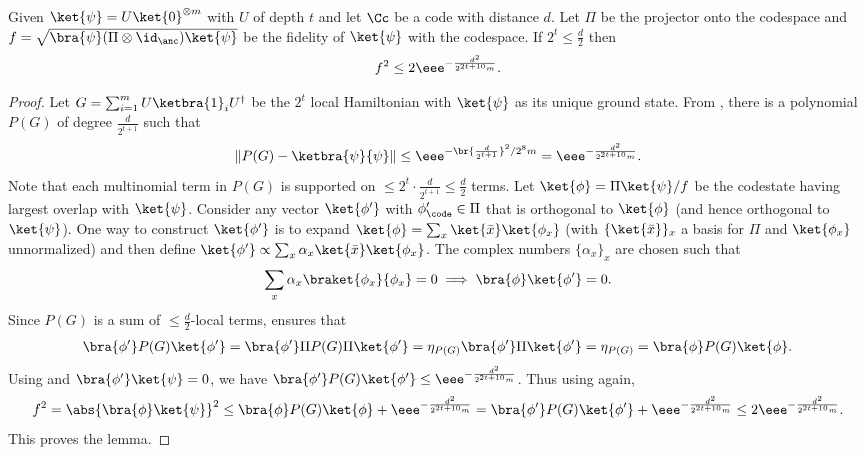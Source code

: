 \documentclass{toc}
\begin{document}
\begin{lemma}
\label{lem:distfidbound}
Given $\ket{\psi}=U\ket{0}^{\otimes m}$ with $U$ of depth $t$ and let $\Cc$ be a code with distance $d$. Let $\Pi$ be the projector onto the codespace and  $f=\sqrt{\bra{\psi}(\Pi\otimes \id_{\anc})\ket{\psi}}$ be the fidelity of $\ket{\psi}$ with the codespace. If $2^t\leq \frac{d}{2}$ then
\begin{align}f^2\leq 2\eee^{-\frac{d^2}{2^{2t+10}m}}.\end{align}
\end{lemma}
\begin{proof}
Let $G= \sum_{i=1}^m U\ketbra{1}_i U^{\dagger}$ be the $2^t$ local Hamiltonian with $\ket{\psi}$ as its unique ground state. From , there is a polynomial $P(G)$ of degree $\frac{d}{2^{t+1}}$ such that
\begin{equation}
\label{eq:KLSpoly}
\|P(G)-\ketbra{\psi}{\psi}\|\leq \eee^{-\br{\frac{d}{2^{t+1}}}^2/2^8m} = \eee^{-\frac{d^2}{2^{2t+10}m}}.    
\end{equation}
Note that each multinomial term in $P(G)$ is supported on $\leq 2^t\cdot \frac{d}{2^{t+1}} \leq \frac{d}{2}$ terms. Let $\ket{\phi}= \Pi\ket{\psi}/f$ be the codestate having largest overlap with $\ket{\psi}$. Consider any vector $\ket{\phi'}$ with $\phi'_{\code}\in \Pi$ that is orthogonal to $\ket{\phi}$ (and hence orthogonal to $\ket{\psi}$). One way to construct $\ket{\phi'}$ is to expand $\ket{\phi}=\sum_x \ket{\bar{x}}\ket{\phi_x}$ (with $\{\ket{\bar{x}}\}_x$ a basis for $\Pi$ and $\ket{\phi_x}$ unnormalized) and then define $\ket{\phi'}\propto\sum_x \alpha_x\ket{\bar{x}}\ket{\phi_x}$. The complex numbers $\{\alpha_x\}_x$ are chosen such that 
\begin{align}\sum_x \alpha_x \braket{\phi_x}{\phi_x}=0 \implies \bra{\phi}\ket{\phi'}=0.\end{align}
Since $P(G)$ is a sum of $\leq \frac{d}{2}$-local terms,  ensures that \begin{align}\bra{\phi'}P(G)\ket{\phi'}=\bra{\phi'}\Pi P(G)\Pi\ket{\phi'}=\eta_{P(G)}\bra{\phi'}\Pi \ket{\phi'}=\eta_{P(G)}=\bra{\phi}P(G)\ket{\phi}.
\end{align}
Using  and $\bra{\phi'}\ket{\psi}=0$, we have $\bra{\phi'}P(G)\ket{\phi'} \leq \eee^{-\frac{d^2}{2^{2t+10}m}}$. Thus using  again, 
\begin{equation}
\label{eq:fidupbd}
    f^2=\abs{\bra{\phi}\ket{\psi}}^2 \leq \bra{\phi}P(G)\ket{\phi} + \eee^{-\frac{d^2}{2^{2t+10}m}}=\bra{\phi'}P(G)\ket{\phi'} + \eee^{-\frac{d^2}{2^{2t+10}m}}\leq 2\eee^{-\frac{d^2}{2^{2t+10}m}}.
\end{equation}
This proves the lemma.
\end{proof}
\end{document}
